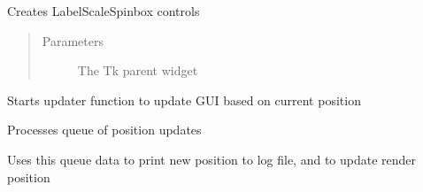 \documentclass[letterpaper,10pt,english,openany,oneside]{sphinxmanual}
\begin{document}
\begin{fulllineitems}
\begin{fulllineitems}
\begin{quote}
\begin{description}
\end{description}\end{quote}

\end{fulllineitems}


\begin{fulllineitems}
\label{\detokenize{src/positionframe:PositionFrame.PositionFrame.create_controls}}
Creates LabelScaleSpinbox controls
\begin{quote}\begin{description}
\item[{Parameters}] \leavevmode
{} \textendash{} The Tk parent widget

\end{description}\end{quote}

\end{fulllineitems}


\begin{fulllineitems}
\label{\detokenize{src/positionframe:PositionFrame.PositionFrame.create_updater}}
Starts updater function to update GUI based on current position

\end{fulllineitems}


\begin{fulllineitems}
\label{\detokenize{src/positionframe:PositionFrame.PositionFrame.process_queue}}
Processes queue of position updates

Uses this queue data to print new position to log file, and to update render position

\end{fulllineitems}


\end{fulllineitems}
\end{document}
